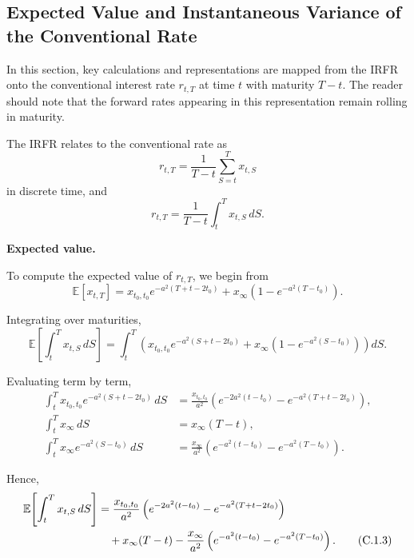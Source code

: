 \documentclass[12pt]{article}
\theoremstyle{statementstyle}
\begin{document}
\begin{appendices}
\subsection{Expected Value and Instantaneous Variance of the Conventional Rate}
\label{appendix:C1}

In this section, key calculations and representations are mapped from the IRFR
onto the conventional interest rate \(r_{t,T}\) at time \(t\) with maturity \(T-t\).
The reader should note that the forward rates appearing in this representation remain rolling in maturity.

The IRFR relates to the conventional rate as
\[
r_{t,T}
=
\frac{1}{T-t}\sum_{S=t}^{T} x_{t,S}
\]
in discrete time, and
\begin{equation}
r_{t,T}
=
\frac{1}{T-t}\int_t^T x_{t,S}\,dS.
\tag{C.1.1}\label{eq:C11}
\end{equation}

\medskip
\noindent\textbf{Expected value.}

To compute the expected value of \(r_{t,T}\), we begin from
\begin{equation}
\mathbb{E}[x_{t,T}]
=
x_{t_0,t_0}e^{-a^2(T+t-2t_0)}
+
x_\infty\left(1-e^{-a^2(T-t_0)}\right).
\tag{C.1.2}\label{eq:C12}
\end{equation}

Integrating over maturities,
\[
\mathbb{E}\!\left[\int_t^T x_{t,S}\,dS\right]
=
\int_t^T
\left(
x_{t_0,t_0}e^{-a^2(S+t-2t_0)}
+
x_\infty\left(1-e^{-a^2(S-t_0)}\right)
\right)dS.
\]

Evaluating term by term,
\begin{align*}
\int_t^T x_{t_0,t_0}e^{-a^2(S+t-2t_0)}\,dS
&=
\frac{x_{t_0,t_0}}{a^2}
\left(
e^{-2a^2(t-t_0)}
-
e^{-a^2(T+t-2t_0)}
\right), \\
\int_t^T x_\infty\,dS
&=
x_\infty (T-t), \\
\int_t^T x_\infty e^{-a^2(S-t_0)}\,dS
&=
\frac{x_\infty}{a^2}
\left(
e^{-a^2(t-t_0)}
-
e^{-a^2(T-t_0)}
\right).
\end{align*}

Hence,
\begin{align}
\mathbb{E}\!\left[\int_t^T x_{t,S}\,dS\right]
&=
\frac{x_{t_0,t_0}}{a^2}
\left(
e^{-2a^2(t-t_0)}
-
e^{-a^2(T+t-2t_0)}
\right) \notag \\
&\quad
+ x_\infty (T-t)
- \frac{x_\infty}{a^2}
\left(
e^{-a^2(t-t_0)}
-
e^{-a^2(T-t_0)}
\right).
\tag{C.1.3}\label{eq:C13}
\end{align}


\end{appendices}
\end{document}
